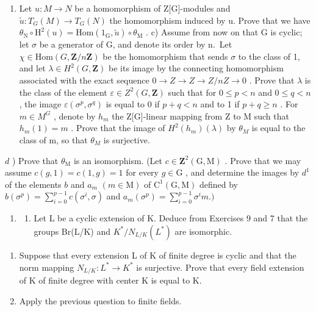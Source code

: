 \begin{enumerate}
\def\labelenumi{\alph{enumi})}
\setcounter{enumi}{1}
\tightlist
\item
  Let \(u: M \to N\) be a homomorphism of Z{[}G{]}-modules and \(\widetilde{u}: T_{G}(M) \to T_{G}(N)\) the homomorphism induced by u. Prove that we have \(\theta_{\mathrm{N}} \circ \mathrm{H}^{2}(u) = \mathrm{Hom}(1_{\mathrm{G}}, \widetilde{u}) \circ \theta_{\mathrm{M}}\) . c) Assume from now on that G is cyclic; let \(\sigma\) be a generator of G, and denote its order by n.~Let \(\chi \in \mathrm{Hom}(G, \mathbf{Z}/n\mathbf{Z})\) be the homomorphism that sends \(\sigma\) to the class of 1, and let \(\lambda \in H^{2}(G, \mathbf{Z})\) be its image by the connecting homomorphism associated with the exact sequence \(0 \to Z \to Z \to Z/nZ \to 0\) . Prove that \(\lambda\) is the class of the element \(\varepsilon \in Z^{2}(G, \mathbf{Z})\) such that for \(0 \leqslant p < n\) and \(0 \leqslant q < n\) , the image \(\varepsilon(\sigma^{p}, \sigma^{q})\) is equal to 0 if \(p + q < n\) and to 1 if \(p + q \geqslant n\) . For \(m \in M^{G}\) , denote by \(h_{m}\) the Z{[}G{]}-linear mapping from Z to M such that \(h_{m}(1) = m\) . Prove that the image of \(H^{2}(h_{m})(\lambda)\) by \(\theta_{M}\) is equal to the class of m, so that \(\theta_{M}\) is surjective.
\end{enumerate}

\(d\) ) Prove that \(\theta_{\mathrm{M}}\) is an isomorphism. (Let \(c\in \mathbf{Z}^2 (\mathrm{G},\mathrm{M})\) . Prove that we may assume \(c(g,1) = c(1,g) = 1\) for every \(g\in \mathrm{G}\) , and determine the images by \(d^1\) of the elements \(b\) and \(a_{m}\) \((m\in \mathrm{M})\) of \(\mathrm{C}^1 (\mathrm{G},\mathrm{M})\) defined by \(b(\sigma^{p}) = \sum_{i = 0}^{p - 1}c(\sigma^{i},\sigma)\) and \(a_{m}(\sigma^{p}) = \sum_{i = 0}^{p - 1}\sigma^{i}m.)\)

\begin{enumerate}
\def\labelenumi{\arabic{enumi})}
\setcounter{enumi}{9}
\tightlist
\item
  \begin{enumerate}
  \def\labelenumii{\alph{enumii})}
  \tightlist
  \item
    Let L be a cyclic extension of K. Deduce from Exercises 9 and 7 that the groups Br(L/K) and \(K^{*}/N_{L/K}(L^{*})\) are isomorphic.
  \end{enumerate}
\end{enumerate}

\begin{enumerate}
\def\labelenumi{\alph{enumi})}
\setcounter{enumi}{1}
\item
  Suppose that every extension L of K of finite degree is cyclic and that the norm mapping \(N_{L/K}: L^{*} \to K^{*}\) is surjective. Prove that every field extension of K of finite degree with center K is equal to K.
\item
  Apply the previous question to finite fields.
\end{enumerate}

